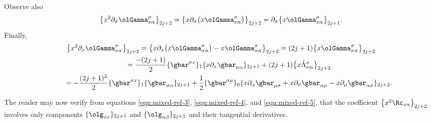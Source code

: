 Observe also
\begin{gather}\label{eqn:mixed-ref-4}
\big\{x^2 \partial_{\sigma} \olGamma_{x \alpha}^{\sigma}\big\}_{2j+2} = \big\{ x \partial_{\sigma} \big( x \olGamma_{x \alpha}^{\sigma} \big) \big\}_{2j+2}= \partial_{\sigma}\big\{ x \olGamma_{x \alpha}^{\sigma} \big\}_{2j+1}.
\end{gather}
Finally,
\begin{gather}
\big\{x^2 \partial_{x} \olGamma_{\sigma \alpha}^{\sigma}\big\}_{2j+2} = \big\{x \partial_{x} \big(x\olGamma_{\sigma \alpha}^{\sigma}\big) - x\olGamma_{\sigma \alpha}^{\sigma} \big\}_{2j+2}
 = (2j+1)\big\{x\olGamma_{\sigma \alpha}^{\sigma} \big\}_{2j+2}\nonumber \\
\qquad{} = \frac{-(2j+1)}{2} \{ \gbar^{\sigma x} \}_1 \{x \partial_x \gbar_{\sigma \alpha} \}_{2j+1} + (2j+1)\big\{ x \hat{\Lambda}_{\sigma \alpha}^{\sigma}\big\}_{2j+2} \nonumber\\
\qquad{} = -\frac{(2j+1)^2}{2} \{ \gbar^{\sigma x} \}_1 \{\gbar_{\sigma \alpha} \}_{2j+1} + \frac{1}{2}
\{\gbar^{\sigma \mu}\}_0 \{ x\partial_{\alpha} \gbar_{\mu \sigma}+ x\partial_{\sigma} \gbar_{\alpha \mu} - x\partial_{\mu} \gbar_{\alpha \sigma}\}_{2j+2}.\label{eqn:mixed-ref-5}
\end{gather}

The reader may now verify from equations \eqref{eqn:mixed-ref-3}, \eqref{eqn:mixed-ref-4}, and \eqref{eqn:mixed-ref-5}, that the coefficient $\big\{ x^2 \Rc_{x\alpha} \big\}_{2j+2}$ involves only components $\{ \olg_{xx} \}_{2j+1}$ and $\{ \olg_{\alpha \beta} \}_{2j+1}$ and their tangential derivatives.
